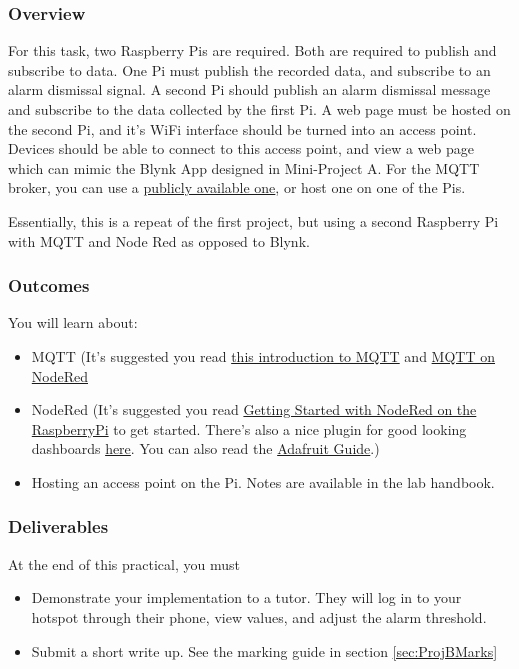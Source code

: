 \subsubsection{Overview}
For this task, two Raspberry Pis are required. Both are required to publish and subscribe to data. One Pi must publish the recorded data, and subscribe to an alarm dismissal signal. A second Pi should publish an alarm dismissal message and subscribe to the data collected by the first Pi. A web page must be hosted on the second Pi, and it's WiFi interface should be turned into an access point. Devices should be able to connect to this access point, and view a web page which can mimic the Blynk App designed in Mini-Project A. For the MQTT broker, you can use a \href{https://diyprojects.io/8-online-mqtt-brokers-iot-connected-objects-cloud/}{publicly available one}, or host one on one of the Pis.

Essentially, this is a repeat of the first project, but using a second Raspberry Pi with MQTT and Node Red as opposed to Blynk.

\subsubsection{Outcomes}
You will learn about:
\begin{itemize}
    \item MQTT (It's suggested you read \href{https://randomnerdtutorials.com/what-is-mqtt-and-how-it-works/}{this introduction to MQTT} and \href{https://cookbook.nodered.org/mqtt/}{MQTT on NodeRed}
    \item NodeRed (It's suggested you read \href{https://nodered.org/docs/getting-started/raspberrypi}{Getting Started with NodeRed on the RaspberryPi} to get started. There's also a nice plugin for good looking dashboards \href{https://flows.nodered.org/node/node-red-dashboard}{here}. You can also read the \href{https://learn.adafruit.com/raspberry-pi-hosting-node-red}{Adafruit Guide}.)
    \item Hosting an access point on the Pi. Notes are available in the lab handbook. 
\end{itemize}

\subsubsection{Deliverables}
At the end of this practical, you must
\begin{itemize}
    \item Demonstrate your implementation to a tutor. They will log in to your hotspot through their phone, view values, and adjust the alarm threshold.
    \item Submit a short write up. See the marking guide in section \ref{sec:ProjBMarks}
\end{itemize}

